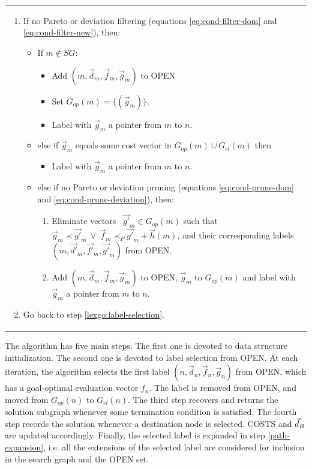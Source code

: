 \begin{table}
{\begin{tabular}{p{\columnwidth}}
\begin{enumerate}
\begin{enumerate}
    \item If no Pareto or deviation filtering (equations \ref{eq:cond-filter-dom} and \ref{eq:cond-filter-new}), then:
      \begin{itemize}
      \item If $m \notin SG$: 
	\begin{itemize}
	\item Add $(m, \vec{d}_m, \vec{f}_m, \vec{g}_m)$ to OPEN
	\item Set $G_{op}(m)= \{(\vec{g}_m)\}$.
	\item Label with $\vec{g}_m$ a pointer from $m$ to $n$.
	\end{itemize}
      \item else if $\vec{g}_m$ equals some cost vector in  $G_{op}(m) \cup G_{cl}(m)$ then
	\begin{itemize}
	\item Label with $\vec{g}_m$ a pointer from $m$ to $n$.
	\end{itemize}
      \item else if no Pareto or deviation pruning (equations \ref{eq:cond-prune-dom} and \ref{eq:cond-prune-deviation}), then:  
	\begin{enumerate}
   \item Eliminate vectors \ $\vec{g'}_{m} \in G_{op}(m)$ such that $\vec{g}_m \prec \vec{g'}_{m} \ \lor \ \vec{f}_m \prec_P \vec{g'}_{m} + \vec{h}(m)$, and their corresponding labels $(m, \vec{d'}_{m}, \vec{f'}_{m}, \vec{g'}_{m})$ from OPEN.
	\item Add $(m, \vec{d}_m, \vec{f}_m, \vec{g}_m)$ to OPEN,
          $\vec{g}_m$ to $G_{op}(m)$ and label with $\vec{g}_m$ a
          pointer from $m$ to $n$.
	\end{enumerate}
      \end{itemize}
	\item Go back to step \ref{lexgo:label-selection}.
    \end{enumerate}        
\end{enumerate}
\\
\end{tabular}
}
\label{tab:pseudocode-lexgo} 
\end{table}

The algorithm has five main steps. The first one is devoted to data structure initialization. The second one is devoted to label selection from OPEN. At each iteration, the algorithm selects the first label  $(n, \vec{d}_n, \vec{f}_n, \vec{g}_n)$ from OPEN, which has a goal-optimal evaluation vector $f_n$. The label is removed from OPEN, and moved from $G_{op}(n)$ to $G_{cl}(n)$. The third step recovers and returns the solution subgraph whenever some termination condition is satisfied. The fourth step records the solution whenever a destination node is selected. COSTS and $\vec{d}_B$ are updated accordingly. Finally, the selected label is expanded in step \ref{path-expansion}, i.e. all the extensions of the selected label are considered for inclusion in the search graph and the OPEN set. 

